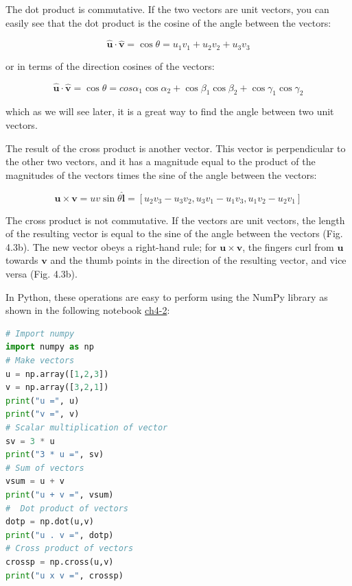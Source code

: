 \documentclass[a4paper , 12pt]{book}
\begin{document}
The dot product is commutative. If the two vectors are unit vectors, you can easily see that the dot product is the cosine of the angle between the vectors:

\begin{equation}
    \mathbf{\hat u} \cdot\mathbf{\hat v}=\cos\theta=u_1v_1+u_2v_2+u_3v_3
\end{equation}

or in terms of the direction cosines of the vectors:

\begin{equation}
    \mathbf{\hat u} \cdot\mathbf{\hat v}=\cos\theta=cos\alpha_1\cos\alpha_2+\cos\beta_1\cos\beta_2+\cos\gamma_1\cos\gamma_2
\end{equation}

which as we will see later, it is a great way to find the angle between two unit vectors.

The result of the cross product is another vector. This vector is perpendicular to the other two vectors, and it has a magnitude equal to the product of the magnitudes of the vectors times the sine of the angle between the vectors:

\begin{equation}
    \mathbf u\times\mathbf v=uv\sin\theta\mathbf{\hat l}=[u_2v_3-u_3v_2,u_3v_1-u_1v_3,u_1v_2-u_2v_1]
\end{equation}

The cross product is not commutative. If the vectors are unit vectors, the length of the resulting vector is equal to the sine of the angle between the vectors (Fig. 4.3b). The new vector obeys a right-hand rule; for $\mathbf u\times\mathbf v$, the fingers curl from $\mathbf u$ towards $\mathbf v$ and the thumb points in the direction of the resulting vector, and vice versa (Fig. 4.3b).

In Python, these operations are easy to perform using the NumPy library as shown in the following notebook \href{https://github.com/nfcd/compGeo/blob/master/source/notebooks/ch4-2.ipynb}{ch4-2}:

\begin{center}
\begin{lstlisting}[language=Python, frame=single]
# Import numpy
import numpy as np
# Make vectors
u = np.array([1,2,3])
v = np.array([3,2,1])
print("u =", u)
print("v =", v)
# Scalar multiplication of vector
sv = 3 * u
print("3 * u =", sv)
# Sum of vectors
vsum = u + v
print("u + v =", vsum)
#  Dot product of vectors
dotp = np.dot(u,v)
print("u . v =", dotp)
# Cross product of vectors
crossp = np.cross(u,v) 
print("u x v =", crossp)
\end{lstlisting}
\end{center}
\end{document}
